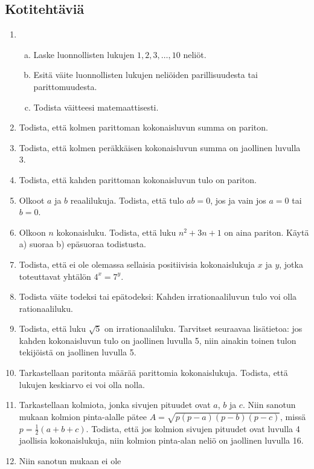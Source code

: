 \subsection*{Kotitehtäviä}

\begin{enumerate}
	\item \begin{enumerate}[a)]
		\item Laske luonnollisten lukujen $1, 2, 3,\ldots, 10$ neliöt.
		\item Esitä väite luonnollisten lukujen neliöiden parillisuudesta tai parittomuudesta.
		\item Todista väitteesi matemaattisesti.
		\end{enumerate}
	\item Todista, että kolmen parittoman kokonaisluvun summa on pariton.
	\item Todista, että kolmen peräkkäisen kokonaisluvun summa on jaollinen luvulla 3.
	\item Todista, että kahden parittoman kokonaisluvun tulo on pariton.
	\item Olkoot $a$ ja $b$ reaalilukuja. Todista, että tulo $ab = 0$, jos ja vain jos $a=0$ tai $b=0$.
	\item Olkoon $n$ kokonaisluku. Todista, että luku $n^{2} + 3n + 1$ on aina pariton. Käytä a) suoraa b) epäsuoraa
		todistusta.
	\item Todista, että ei ole olemassa sellaisia positiivisia kokonaislukuja $x$ ja $y$, jotka toteuttavat
		yhtälön $4^{x} = 7^{y}$.
	\item Todista väite todeksi tai epätodeksi: Kahden
		irrationaaliluvun tulo voi olla rationaaliluku.
	\item Todista, että luku $\sqrt{5}$ on irrationaaliluku.
		Tarvitset seuraavaa lisätietoa: jos kahden kokonaisluvun
		tulo on jaollinen luvulla 5, niin ainakin toinen tulon
		tekijöistä on jaollinen luvulla 5.
	\item Tarkastellaan paritonta määrää parittomia kokonaislukuja.
		Todista, että lukujen keskiarvo ei voi olla nolla.
	\item Tarkastellaan kolmiota, jonka sivujen pituudet ovat
		$a$, $b$ ja $c$. Niin sanotun  mukaan
		kolmion pinta-alalle pätee $A = \sqrt{p(p-a)(p-b)(p-c)}$,
		missä $p = \frac{1}{2}(a+b+c)$. Todista, että jos kolmion
		sivujen pituudet ovat luvulla 4 jaollisia kokonaislukuja,
		niin kolmion pinta-alan neliö on jaollinen luvulla 16.
	\item Niin sanotun  mukaan ei ole

\end{enumerate}
